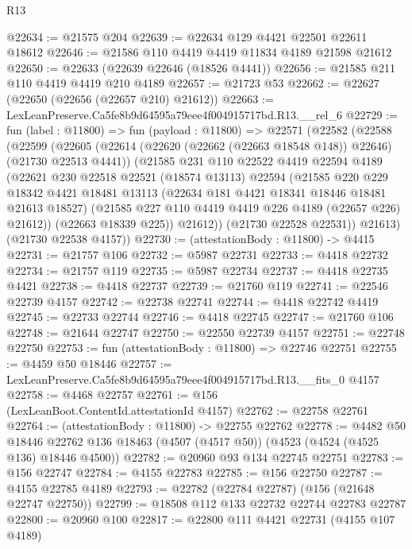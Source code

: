 \begin{lexlean}{R13}
\begin{coremodule}
@22634 := @21575 @204
@22639 := @22634 @129 @4421 @22501 @22611 @18612
@22646 := @21586 @110 @4419 @4419 @11834 @4189 @21598 @21612
@22650 := @22633 (@22639 @22646 (@18526 @4441))
@22656 := @21585 @211 @110 @4419 @4419 @210 @4189
@22657 := @21723 @53
@22662 := @22627 (@22650 (@22656 (@22657 @210) @21612))
@22663 := LexLeanPreserve.Ca5fe8b9d64595a79eee4f004915717bd.R13.__rel_6
@22729 := fun (label : @11800) =>
  fun (payload : @11800) =>
  @22571
    (@22582
      (@22588
        (@22599
          (@22605
            (@22614 (@22620 (@22662 (@22663 @18548 @148)) @22646) (@21730 @22513 @4441))
            (@21585
              @231
              @110
              @22522
              @4419
              @22594
              @4189
              (@22621
                @230
                @22518
                @22521
                (@18574 @13113)
                @22594
                (@21585
                  @220
                  @229
                  @18342
                  @4421
                  @18481
                  @13113
                  (@22634 @181 @4421 @18341 @18446 @18481 @21613 @18527)
                  (@21585 @227 @110 @4419 @4419 @226 @4189 (@22657 @226) @21612))
                (@22663 @18339 @225))
              @21612))
          (@21730 @22528 @22531))
        @21613)
      (@21730 @22538 @4157))
@22730 := (attestationBody : @11800) -> @4415
@22731 := @21757 @106
@22732 := @5987 @22731
@22733 := @4418 @22732
@22734 := @21757 @119
@22735 := @5987 @22734
@22737 := @4418 @22735 @4421
@22738 := @4418 @22737
@22739 := @21760 @119
@22741 := @22546 @22739 @4157
@22742 := @22738 @22741
@22744 := @4418 @22742 @4419
@22745 := @22733 @22744
@22746 := @4418 @22745
@22747 := @21760 @106
@22748 := @21644 @22747
@22750 := @22550 @22739 @4157
@22751 := @22748 @22750
@22753 := fun (attestationBody : @11800) => @22746 @22751
@22755 := @4459 @50 @18446
@22757 := LexLeanPreserve.Ca5fe8b9d64595a79eee4f004915717bd.R13.__fits_0 @4157
@22758 := @4468 @22757
@22761 := @156 (LexLeanBoot.ContentId.attestationId @4157)
@22762 := @22758 @22761
@22764 := (attestationBody : @11800) -> @22755 @22762
@22778 := @4482
    @50
    @18446
    @22762
    @136
    @18463
    (@4507 (@4517 @50))
    (@4523 (@4524 (@4525 @136) @18446 @4500))
@22782 := @20960 @93 @134 @22745 @22751
@22783 := @156 @22747
@22784 := @4155 @22783
@22785 := @156 @22750
@22787 := @4155 @22785 @4189
@22793 := @22782 (@22784 @22787) (@156 (@21648 @22747 @22750))
@22799 := @18508 @112 @133 @22732 @22744 @22783 @22787
@22800 := @20960 @100
@22817 := @22800
    @111
    @4421
    @22731
    (@4155 @107 @4189)

\end{coremodule}
\end{lexlean}
